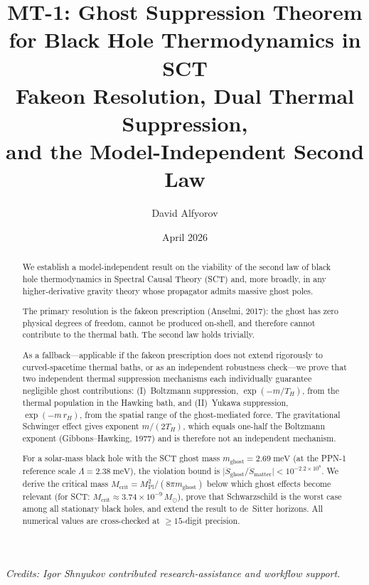 \documentclass[11pt,a4paper]{article}
\title{%
  \textbf{MT-1: Ghost Suppression Theorem}\\[4pt]
  \textbf{for Black Hole Thermodynamics in SCT}\\[6pt]
  \large Fakeon Resolution, Dual Thermal Suppression,\\
  and the Model-Independent Second Law
}
\author{David Alfyorov}
\date{April 2026}
\newcommand{\MPl}{M_{\mathrm{Pl}}}
\newcommand{\Msun}{M_{\odot}}
\newcommand{\Mcrit}{M_{\mathrm{crit}}}
\newcommand{\mghost}{m_{\mathrm{ghost}}}
\newcommand{\Thr}{T_{\!\scriptscriptstyle H}}
\theoremstyle{plain}
\theoremstyle{definition}
\begin{document}
\maketitle

\begin{center}
\small\textit{Credits: Igor Shnyukov contributed research-assistance
and workflow support.}
\end{center}

\begin{abstract}
We establish a model-independent result on the viability of the second
law of black hole thermodynamics in Spectral Causal Theory (SCT) and,
more broadly, in any higher-derivative gravity theory whose propagator
admits massive ghost poles.

The primary resolution is the fakeon prescription (Anselmi, 2017): the
ghost has zero physical degrees of freedom, cannot be produced
on-shell, and therefore cannot contribute to the thermal bath.  The
second law holds trivially.

As a fallback---applicable if the fakeon prescription does not extend
rigorously to curved-spacetime thermal baths, or as an independent
robustness check---we prove that two independent thermal suppression
mechanisms each individually guarantee negligible ghost contributions:
(I)~Boltzmann suppression, $\exp(-m/\Thr)$, from the thermal
population in the Hawking bath, and (II)~Yukawa suppression,
$\exp(-m\,r_H)$, from the spatial range of the ghost-mediated force.
The gravitational Schwinger effect gives exponent $m/(2\Thr)$, which
equals one-half the Boltzmann exponent (Gibbons--Hawking, 1977) and is
therefore not an independent mechanism.

For a solar-mass black hole with the SCT ghost mass
$\mghost = 2.69\;\mathrm{meV}$ (at the PPN-1 reference scale
$\Lambda = 2.38\;\mathrm{meV}$), the violation bound is
$\lvert\dot S_{\mathrm{ghost}}/\dot S_{\mathrm{matter}}\rvert
< 10^{-2.2\times 10^{8}}$.  We derive the critical mass
$\Mcrit = \MPl^2/(8\pi\mghost)$ below which ghost effects
become relevant (for SCT: $\Mcrit \approx 3.74\times 10^{-9}\,\Msun$),
prove that Schwarzschild is the worst case among all stationary
black holes, and extend the result to de~Sitter horizons.  All
numerical values are cross-checked at $\geq 15$-digit precision.
\end{abstract}

\tableofcontents

\end{document}
